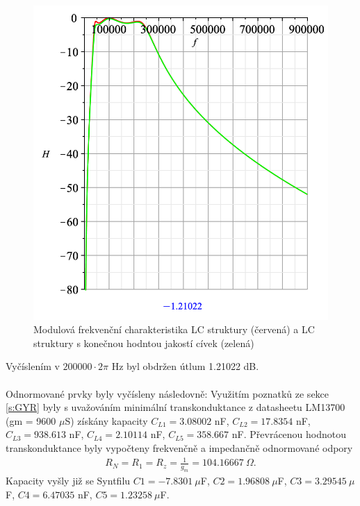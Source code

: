 \endgroup
\begin{figure}[h]
\centering
\includegraphics[scale=0.6]{modul12.png}
\caption{Modulová frekvenční charakteristika LC struktury (červená) a LC struktury s konečnou hodntou jakostí cívek (zelená)}
\end{figure}
\noindent Vyčíslením v $200000 \cdot 2 \pi$ Hz byl obdržen útlum 1.21022 dB.\\
\\
\noindent Odnormované prvky byly vyčísleny následovně:
\noindent Využitím poznatků ze sekce \ref{s:GYR} byly s uvažováním minimální transkonduktance z datasheetu LM13700 (gm = 9600 $\mu$S) získány kapacity $C_{L1} = 3.08002 $ nF, $C_{L2} = 17.8354$ nF, $C_{L3} = 938.613 $ nF, $C_{L4} = 2.10114$ nF, $C_{L5} = 358.667$ nF.
\noindent Převrácenou hodnotou transkonduktance byly vypočteny frekvenčně a impedančně odnormované odpory
\begin{align}
R_N = R_1 = R_z = \frac{1}{g_m} = 104.16667 \ \Omega.
\end{align}
\noindent Kapacity vyšly již se Syntfilu $C1 = -7.8301 \  \mu$F, $C2 = 1.96808 \  \mu$F, $C3 = 3.29545 \  \mu$F, $C4 = 6.47035$ nF, $C5 = 1.23258 \  \mu$F.
\newpage
